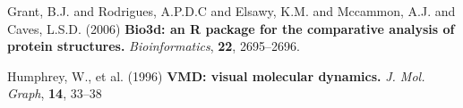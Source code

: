 \documentclass[letter]{article}
\begin{document}
\begin{thebibliography}{9}


Grant, B.J. and Rodrigues, A.P.D.C and Elsawy, K.M. and Mccammon, A.J. and Caves, L.S.D. (2006)
\textbf{Bio3d: an R package for the comparative analysis of protein structures.}
\emph{Bioinformatics},
\textbf{22}, 2695--2696.


Humphrey, W., et al. (1996)
\textbf{VMD: visual molecular dynamics.}
\emph{J. Mol. Graph}, \textbf{14}, 33--38


\end{thebibliography}
\end{document}
